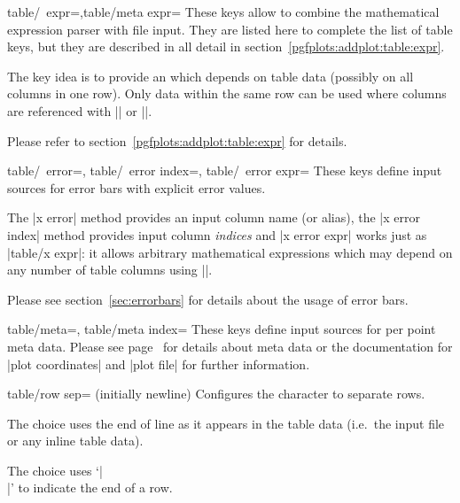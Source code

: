 {\begin{pgfplotsxykeylist}{table/\x\ expr=,table/meta expr=}
	These keys allow to combine the mathematical expression parser with file input. They are listed here to complete the list of table keys, but they are described in all detail in section~\ref{pgfplots:addplot:table:expr}.

	The key idea is to provide an  which depends on table data (possibly on all columns in one row). Only data within the same row can be used where columns are referenced with |\thisrow| or |\thisrowno|. 
	
	Please refer to section~\ref{pgfplots:addplot:table:expr} for details.
\end{pgfplotsxykeylist}


\begin{pgfplotsxykeylist}{%
	table/\x\ error=,
	table/\x\ error index=,
	table/\x\ error expr=}
	These keys define input sources for error bars with explicit error values. 
	
	The |x error| method provides an input column name (or alias), the |x error index| method provides input column \emph{indices} and |x error expr| works just as |table/x expr|: it allows arbitrary mathematical expressions which may depend on any number of table columns using |\thisrow|.

	Please see section~\ref{sec:errorbars} for details about the usage of error bars.
\end{pgfplotsxykeylist}
\begin{pgfplotsxykeylist}{%
	table/meta=,
	table/meta index=}
	These keys define input sources for per point meta data. Please see page~\pageref{pgfplots:scatter:src} for details about meta data or the documentation for |plot coordinates| and |plot file| for further information.
\end{pgfplotsxykeylist}


\begin{pgfplotskey}{table/row sep= (initially newline)}
	Configures the character to separate rows.

	The choice  uses the end of line as it appears in the table data (i.e.\ the input file or any inline table data).

	The choice \declaretext{\string\\} uses `|\\|' to indicate the end of a row.


\end{pgfplotskey}}
